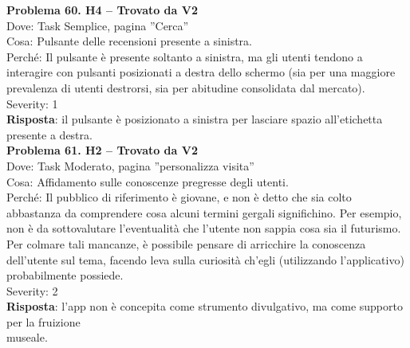 \documentclass{article}
\begin{document}
\noindent \textbf{Problema 60. H4 – Trovato da V2} \\
Dove: Task Semplice, pagina ”Cerca” \\
Cosa: Pulsante delle recensioni presente a sinistra. \\
Perché: Il pulsante è presente soltanto a sinistra, ma gli utenti tendono a interagire con pulsanti posizionati a destra dello schermo (sia per una maggiore prevalenza di utenti destrorsi, sia per abitudine consolidata dal mercato). \\
Severity: 1 \\
\textbf{Risposta}: il pulsante è posizionato a sinistra per lasciare spazio all’etichetta presente a destra.\\

\noindent \textbf{Problema 61. H2 – Trovato da V2} \\
Dove: Task Moderato, pagina ”personalizza visita” \\
Cosa: Affidamento sulle conoscenze pregresse degli utenti. \\
Perché: Il pubblico di riferimento è giovane, e non è detto che sia colto abbastanza da comprendere cosa alcuni termini gergali significhino. Per esempio, non è da sottovalutare l’eventualità che l’utente non sappia cosa sia il futurismo. Per colmare tali mancanze, è possibile pensare di arricchire la conoscenza dell’utente sul tema, facendo leva sulla curiosità ch’egli (utilizzando l’applicativo) probabilmente possiede. \\
Severity: 2 \\
\textbf{Risposta}: l’app non è concepita come strumento divulgativo, ma come supporto per la fruizione \\ museale.
\\
\end{document}
